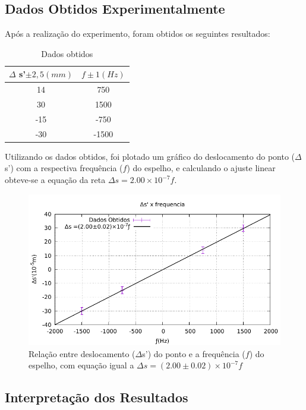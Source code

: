 \subsection{Dados Obtidos Experimentalmente}
Após a realização do experimento, foram obtidos os seguintes resultados:
\begin{table}[h!]
\centering

\begin{tabular}{|	c	|	c	|}
\hline
$\Delta$ s'$\pm 2,5(mm)$ & $f \pm 1(Hz)$   \\ \hline
14          & 750   \\ \hline
30          & 1500  \\ \hline
-15         & -750  \\ \hline
-30         & -1500 \\ \hline
\end{tabular}
\caption{Dados obtidos}
\end{table}

Utilizando os dados obtidos, foi plotado um gráfico do deslocamento do ponto ($\Delta$s') com a respectiva frequência ($f$) do espelho, e calculando o
ajuste linear obteve-se a equação da reta $\Delta s
=2.00\times10^{-7}f$.


\begin{figure}[!ht]
	\centering
		\includegraphics[scale= 1.1]{Graficusao/c.pdf}
	\caption{Relação entre deslocamento ($\Delta$s') do ponto e a
frequência ($f$) do espelho, com equação igual a $\Delta s
=(2.00\pm0.02)\times10^{-7}f$}
\end{figure}

\subsection{Interpretação dos Resultados}

